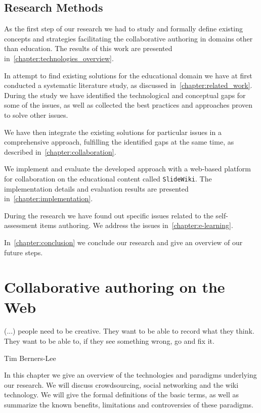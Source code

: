 \documentclass[PhD, Submit, ngerman,UKenglish,table]{scrbook}
\begin{document}
\section{Research Methods}
As the first step of our research we had to study and formally define existing concepts and strategies facilitating the collaborative authoring in domains other than education.
The results of this work are presented in~\autoref{chapter:technologies_overview}.

In attempt to find existing solutions for the educational domain we have at first conducted a systematic literature study, as discussed in~\autoref{chapter:related_work}.
During the study we have identified the technological and conceptual gaps for some of the issues, as well as collected the best practices and approaches proven to solve other issues.

We have then integrate the existing solutions for particular issues in a comprehensive approach, fulfilling the identified gaps at the same time, as described in~\autoref{chapter:collaboration}.

We implement and evaluate the developed approach with a web-based platform for collaboration on the educational content called \texttt{SlideWiki}.
The implementation details and evaluation results are presented in~\autoref{chapter:implementation}.

During the research we have found out specific issues related to the self-assessment items authoring.
We address the issues in~\autoref{chapter:e-learning}.

In~\autoref{chapter:conclusion} we conclude our research and give an overview of our future steps.

\chapter{Collaborative authoring on the Web}
\label{chapter:technologies_overview}
\epigraph{(...) people need to be creative. They want to be able to record what they think. They want to be able to, if they see something wrong, go and fix it.}{Tim Berners-Lee}

In this chapter we give an overview of the technologies and paradigms underlying our research.
We will discuss crowdsourcing, social networking and the wiki technology.
We will give the formal definitions of the basic terms, as well as summarize the known benefits, limitations and controversies of these paradigms.
\end{document}
